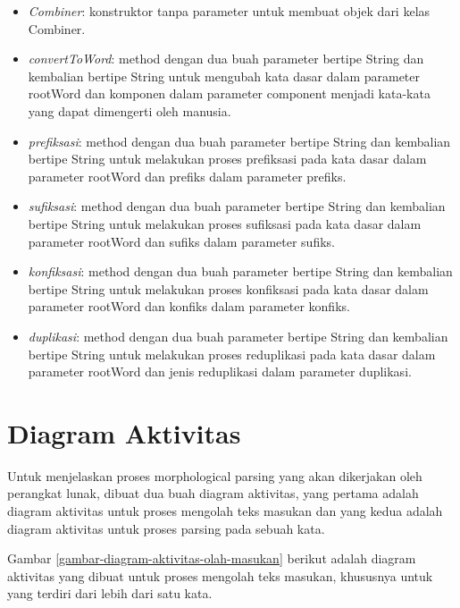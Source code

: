 \begin{itemize}
	\item \textit{Combiner}: konstruktor tanpa parameter untuk membuat objek dari kelas Combiner.
	\item \textit{convertToWord}: method dengan dua buah parameter bertipe String dan kembalian bertipe String untuk mengubah kata dasar dalam parameter rootWord dan komponen dalam parameter component menjadi kata-kata yang dapat dimengerti oleh manusia.
	\item \textit{prefiksasi}: method dengan dua buah parameter bertipe String dan kembalian bertipe String untuk melakukan proses prefiksasi pada kata dasar dalam parameter rootWord dan prefiks dalam parameter prefiks.
	\item \textit{sufiksasi}: method dengan dua buah parameter bertipe String dan kembalian bertipe String untuk melakukan proses sufiksasi pada kata dasar dalam parameter rootWord dan sufiks dalam parameter sufiks.
	\item \textit{konfiksasi}: method dengan dua buah parameter bertipe String dan kembalian bertipe String untuk melakukan proses konfiksasi pada kata dasar dalam parameter rootWord dan konfiks dalam parameter konfiks.
	\item \textit{duplikasi}: method dengan dua buah parameter bertipe String dan kembalian bertipe String untuk melakukan proses reduplikasi pada kata dasar dalam parameter rootWord dan jenis reduplikasi dalam parameter duplikasi.
\end{itemize}

\section{Diagram Aktivitas}
\label{sec:diagramAktivitas}

Untuk menjelaskan proses morphological parsing yang akan dikerjakan oleh perangkat lunak, dibuat dua buah diagram aktivitas, yang pertama adalah diagram aktivitas untuk proses mengolah teks masukan dan yang kedua adalah diagram aktivitas untuk proses parsing pada sebuah kata.

Gambar \ref{gambar-diagram-aktivitas-olah-masukan} berikut adalah diagram aktivitas yang dibuat untuk proses mengolah teks masukan, khususnya untuk yang terdiri dari lebih dari satu kata.

